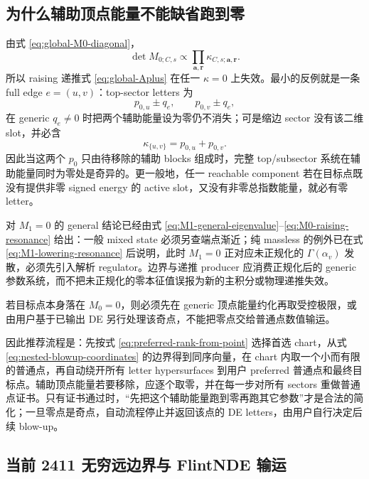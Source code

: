 \documentclass[11pt,a4paper]{ctexart}
\begin{document}
\subsection{为什么辅助顶点能量不能缺省跑到零}

由式 \eqref{eq:global-M0-diagonal}，
\begin{equation}
 \det M_{0;C,s}\propto
 \prod_{\bm a,\bm r}\kappa_{C,s;\bm a,\bm r}.
 \label{eq:M0-determinant-letters}
\end{equation}
所以 raising 递推式 \eqref{eq:global-Aplus} 在任一 $\kappa=0$ 上失效。最小的反例就是一条 full edge $e=(u,v)$：top-sector letters 为
\begin{equation}
 p_{0,u}\pm q_e,
 \qquad
 p_{0,v}\pm q_e,
 \end{equation}
在 generic $q_e\neq0$ 时把两个辅助能量设为零仍不消失；可是缩边 sector 没有该二维 slot，并必含
\begin{equation}
 \kappa_{\{u,v\}}=p_{0,u}+p_{0,v}.
 \label{eq:contracted-zero-letter}
\end{equation}
因此当这两个 $p_0$ 只由待移除的辅助 blocks 组成时，完整 top/subsector 系统在辅助能量同时为零处是奇异的。更一般地，任一 reachable component 若在目标点既没有提供非零 signed energy 的 active slot，又没有非零总指数能量，就必有零 letter。

对 $M_1=0$ 的 general 结论已经由式 \eqref{eq:M1-general-eigenvalue}--\eqref{eq:M0-raising-resonance} 给出：一般 mixed state 必须另查端点渐近；纯 massless 的例外已在式 \eqref{eq:M1-lowering-resonance} 后说明，此时 $M_1=0$ 正对应未正规化的 $\Gamma(\alpha_v)$ 发散，必须先引入解析 regulator。边界与递推 producer 应消费正规化后的 generic 参数系统，而不把未正规化的零本征值误报为新的主积分或物理递推失效。

若目标点本身落在 $M_0=0$，则必须先在 generic 顶点能量约化再取受控极限，或由用户基于已输出 DE 另行处理该奇点，不能把零点交给普通点数值输运。

因此推荐流程是：先按式 \eqref{eq:preferred-rank-from-point} 选择首选 chart，从式 \eqref{eq:nested-blowup-coordinates} 的边界得到同序向量，在 chart 内取一个小而有限的普通点，再自动绕开所有 letter hypersurfaces 到用户 preferred 普通点和最终目标点。辅助顶点能量若要移除，应逐个取零，并在每一步对所有 sectors 重做普通点证书。只有证书通过时，“先把这个辅助能量跑到零再跑其它参数”才是合法的简化；一旦零点是奇点，自动流程停止并返回该点的 DE letters，由用户自行决定后续 blow-up。

\subsection{当前 2411 无穷远边界与 FlintNDE 输运}
\end{document}
